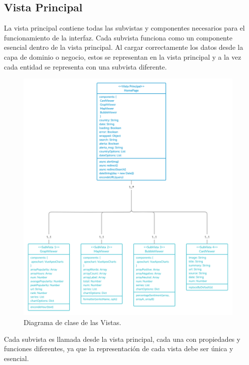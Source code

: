 \subsection{Vista Principal}
La vista principal contiene todas las subvistas y componentes necesarios para el funcionamiento de la interfaz. Cada subvista funciona como un componente esencial dentro de la vista principal. Al cargar correctamente los datos desde la capa de dominio o negocio, estos se representan en la vista principal y a la vez cada entidad se representa con una subvista diferente.

\begin{figure}[H]
    \centering
    \myfloatalign
    \includegraphics[width=1\textwidth]{gfx/Diagrama-de-Vistas.png}
    \caption[Diagrama de clase de las Vistas]{Diagrama de clase de las Vistas.}\label{gfx:Diagrama-de-Vistas}
\end{figure}

Cada subvista es llamada desde la vista principal, cada una con propiedades y funciones diferentes, ya que la representación de cada vista debe ser única y esencial.

\vspace{0.3cm}

